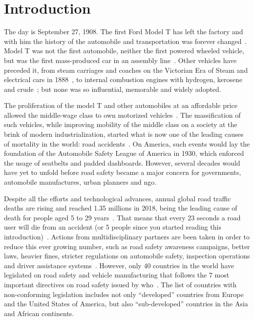 \chapter{Introduction}
\label{chapter:introduction}

The day is September 27, 1908. The first Ford Model T has left the factory and with him the history of the automobile and transportation was forever changed~\cite{Ford, JohnSteeleGordon2007}. Model T was not the first automobile, neither the first powered wheeled vehicle, but was the first mass-produced car in an assembly line~\cite{JohnSteeleGordon2007, DailyNews2013}. Other vehicles have preceded it, from steam carriages and coaches on the Victorian Era of Steam and electrical cars in 1888~\cite{PaulA.Hughes}, to internal combustion engines with hydrogen, kerosene and crude~\cite{Setright2003}; but none was so influential, memorable and widely adopted. 

The proliferation of the model T and other automobiles at an affordable price allowed the middle-wage class to own motorized vehicles~\cite{JohnSteeleGordon2007, DailyNews2013}. The massification of such vehicles, while improving mobility of the middle class on a society at the brink of modern industrialization, started what is now one of the leading causes of mortality in the world: road accidents~\cite{WHO2018}. On America, such events would lay the foundation of the Automobile Safety League of America in 1930, which enforced the usage of seatbelts and padded dashboards. However, several decades would have yet to unfold before road safety became a major concern for governments, automobile manufactures, urban planners and \ac{ngo}. 

Despite all the efforts and technological advances, annual global road traffic deaths are rising and reached 1.35 millions in 2018, being the leading cause of death for people aged 5 to 29 years~\cite{WHO2018}. That means that every 23 seconds a road user will die from an accident (or 5 people since you started reading this introduction)~\cite{WHOvisualizer}. Actions from multidisciplinary partners are been taken in order to reduce this ever growing number, such as road safety awareness campaigns, better laws, heavier fines, stricter regulations on automobile safety, inspection operations and driver assistance systems~\cite{WHO2018, EUroads}. However, only 40 countries in the world have legislated on road safety and vehicle manufacturing that follows the 7 most important directives on road safety issued by \acf{who}~\cite{WHOvisualizer}. The list of countries with non-conforming legislation includes not only ``developed'' countries from Europe and the United States of America, but also ``sub-developed'' countries in the Asia and African continents.

